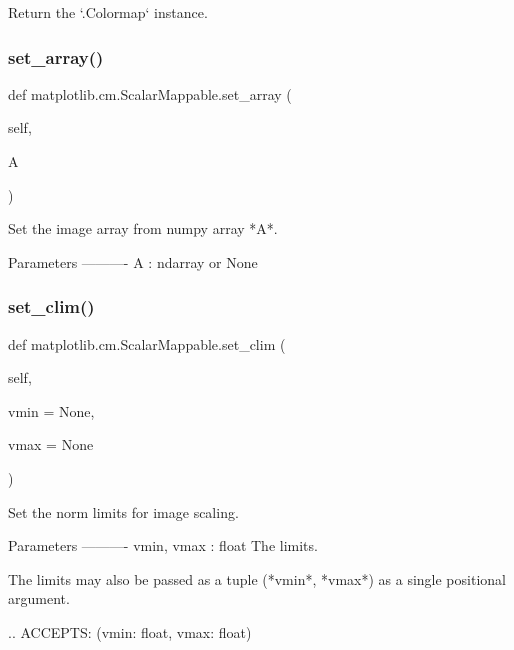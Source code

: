 \begin{DoxyVerb}Return the `.Colormap` instance.\end{DoxyVerb}
 \mbox{\label{classmatplotlib_1_1cm_1_1ScalarMappable_abc8b5ac7556a004691756fa9197f20be}} 
\subsubsection{\texorpdfstring{set\+\_\+array()}{set\_array()}}
{\footnotesize\ttfamily def matplotlib.\+cm.\+Scalar\+Mappable.\+set\+\_\+array (\begin{DoxyParamCaption}\item[{}]{self,  }\item[{}]{A }\end{DoxyParamCaption})}

\begin{DoxyVerb}Set the image array from numpy array *A*.

Parameters
----------
A : ndarray or None
\end{DoxyVerb}
 \mbox{\label{classmatplotlib_1_1cm_1_1ScalarMappable_a2c0eee968e5e43e805db9230c40253d1}} 
\subsubsection{\texorpdfstring{set\+\_\+clim()}{set\_clim()}}
{\footnotesize\ttfamily def matplotlib.\+cm.\+Scalar\+Mappable.\+set\+\_\+clim (\begin{DoxyParamCaption}\item[{}]{self,  }\item[{}]{vmin = {\ttfamily None},  }\item[{}]{vmax = {\ttfamily None} }\end{DoxyParamCaption})}

\begin{DoxyVerb}Set the norm limits for image scaling.

Parameters
----------
vmin, vmax : float
     The limits.

     The limits may also be passed as a tuple (*vmin*, *vmax*) as a
     single positional argument.

     .. ACCEPTS: (vmin: float, vmax: float)
\end{DoxyVerb}
 \mbox{\label{classmatplotlib_1_1cm_1_1ScalarMappable_ab8ef46073dc9cbd74e6b2817dae9bc1d}} 
